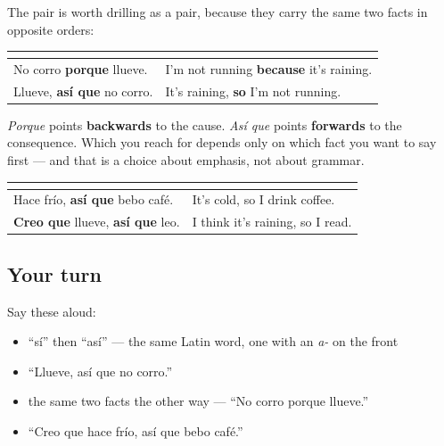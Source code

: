 \begin{grammarlens}[title={Grammar Lens: the two arrows}]
The pair is worth drilling as a pair, because they carry the same two facts in opposite orders:

\noindent
\begin{tabularx}{\linewidth}{@{}>{\raggedright\arraybackslash}X>{\raggedright\arraybackslash}X@{}}
\toprule
\textbf{} & \textbf{} \\
\midrule
No corro \textbf{porque} llueve. & I'm not running \textbf{because} it's raining. \\
Llueve, \textbf{así que} no corro. & It's raining, \textbf{so} I'm not running. \\
\bottomrule
\end{tabularx}

\emph{Porque} points \textbf{backwards} to the cause. \emph{Así que} points \textbf{forwards} to the consequence. Which you reach for depends only on which fact you want to say first — and that is a choice about emphasis, not about grammar.

\noindent
\begin{tabularx}{\linewidth}{@{}>{\raggedright\arraybackslash}X>{\raggedright\arraybackslash}X@{}}
\toprule
\textbf{} & \textbf{} \\
\midrule
Hace frío, \textbf{así que} bebo café. & It's cold, so I drink coffee. \\
\textbf{Creo que} llueve, \textbf{así que} leo. & I think it's raining, so I read. \\
\bottomrule
\end{tabularx}
\end{grammarlens}

\subsection*{Your turn}
Say these aloud:

\begin{itemize}
\raggedright
  \item \textquotedblleft{}sí\textquotedblright{} then \textquotedblleft{}así\textquotedblright{} — the same Latin word, one with an \emph{a-} on the front
  \item \textquotedblleft{}Llueve, así que no corro.\textquotedblright{}
  \item the same two facts the other way — \textquotedblleft{}No corro porque llueve.\textquotedblright{}
  \item \textquotedblleft{}Creo que hace frío, así que bebo café.\textquotedblright{}
\end{itemize}

